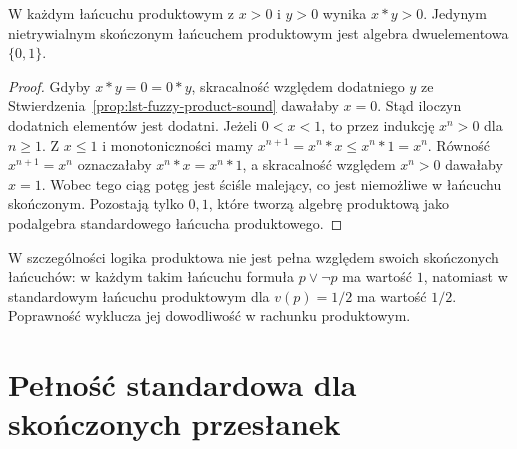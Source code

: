 \begin{wniosek}
\label{cor:ncl-product-finite}
W każdym łańcuchu produktowym z $x>0$ i $y>0$ wynika
$x*y>0$. Jedynym nietrywialnym skończonym łańcuchem
produktowym jest algebra dwuelementowa $\{0,1\}$.
\end{wniosek}
\begin{proof}
Gdyby $x*y=0=0*y$, skracalność względem dodatniego
$y$ ze Stwierdzenia~\ref{prop:lst-fuzzy-product-sound}
dawałaby $x=0$. Stąd iloczyn dodatnich elementów jest dodatni.
Jeżeli $0<x<1$, to przez indukcję $x^n>0$ dla $n\geq1$.
Z $x\leq1$ i monotoniczności mamy
$x^{n+1}=x^n*x\leq x^n*1=x^n$.
Równość $x^{n+1}=x^n$ oznaczałaby $x^n*x=x^n*1$,
a skracalność względem $x^n>0$ dawałaby $x=1$.
Wobec tego ciąg potęg jest ściśle malejący, co jest
niemożliwe w łańcuchu skończonym. Pozostają tylko
$0,1$, które tworzą algebrę produktową jako podalgebra
standardowego łańcucha produktowego.
\end{proof}
W szczególności logika produktowa nie jest pełna
względem swoich skończonych łańcuchów: w każdym
takim łańcuchu formuła $p\vee\neg p$ ma wartość $1$,
natomiast w standardowym łańcuchu produktowym dla
$v(p)=1/2$ ma wartość $1/2$. Poprawność wyklucza
jej dowodliwość w rachunku produktowym.

\section{Pełność standardowa dla skończonych przesłanek}
